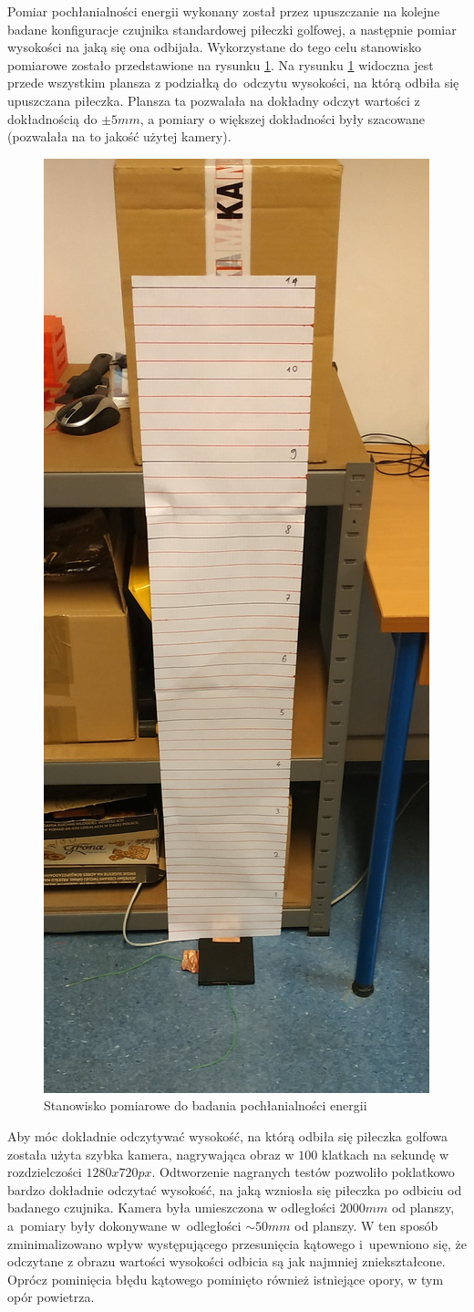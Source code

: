 Pomiar pochłanialności energii wykonany został przez upuszczanie na kolejne badane konfiguracje czujnika standardowej piłeczki golfowej, a następnie pomiar wysokości na jaką się ona odbijała. Wykorzystane do tego celu stanowisko pomiarowe zostało przedstawione na rysunku \ref{f_badanie_3_stanowisko}. Na rysunku \ref{f_badanie_3_stanowisko} widoczna jest przede wszystkim plansza z podziałką do~odczytu wysokości, na którą odbiła się upuszczana piłeczka. Plansza ta pozwalała na dokładny odczyt wartości z dokładnością do $\pm 5mm$, a pomiary o większej dokładności były szacowane (pozwalała na to jakość użytej kamery).

\begin{figure}[!h]
    \centering 
    \includegraphics[width=0.3\linewidth]{img/badanie_3_stanowisko.jpg}
    \caption{Stanowisko pomiarowe do badania pochłanialności energii}
    \label{f_badanie_3_stanowisko}
\end{figure}

Aby móc dokładnie odczytywać wysokość, na którą odbiła się piłeczka golfowa została użyta szybka kamera, nagrywająca obraz w $100$ klatkach na sekundę w rozdzielczości $1280x720 px$. Odtworzenie nagranych testów pozwoliło poklatkowo bardzo dokładnie odczytać wysokość, na jaką wzniosła się piłeczka po odbiciu od badanego czujnika. Kamera była umieszczona w odległości $2000 mm$ od planszy, a~pomiary były dokonywane w~odległości $\sim 50 mm$ od planszy. W ten sposób zminimalizowano wpływ występującego przesunięcia kątowego i~upewniono się, że odczytane z obrazu wartości wysokości odbicia są jak najmniej zniekształcone. Oprócz pominięcia błędu kątowego pominięto również istniejące opory, w tym opór powietrza.

